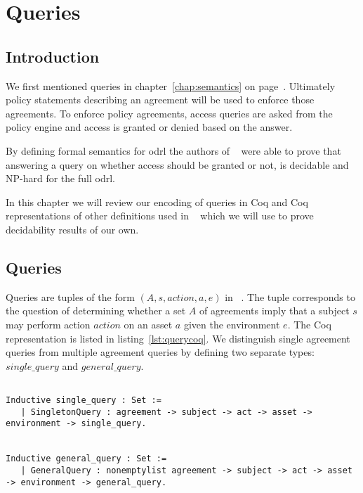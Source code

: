 \chapter{Queries}\label{chap:queries}


\section{Introduction}


We first mentioned queries in chapter~\ref{chap:semantics} on page~\pageref{chap:semantics}. Ultimately policy statements describing an agreement will be used to enforce those agreements. To enforce policy agreements, access queries are asked from the policy engine and access is granted or denied based on the answer.

By defining formal semantics for \ac{odrl} the authors of ~\cite{pucella2006} were able to prove that answering a query on whether access should be granted or not, is decidable and NP-hard for the full \ac{odrl}. 

In this chapter we will review our encoding of queries in Coq and Coq representations of other definitions used in ~\cite{pucella2006} which we will use to prove decidability results of our own. 


\section{Queries}

Queries are tuples of the form $(A, s, action, a, e)$ in ~\cite{pucella2006}. The tuple corresponds to the question of determining whether a set $A$ of agreements imply that a subject $s$ may perform action $action$ on an asset $a$ given the environment $e$. The Coq representation is listed in listing~\ref{lst:querycoq}. We distinguish single agreement queries from multiple agreement queries by defining two separate types: $single\_query$ and $general\_query$.

\begin{lstlisting}

Inductive single_query : Set := 
   | SingletonQuery : agreement -> subject -> act -> asset -> environment -> single_query.
   

Inductive general_query : Set := 
   | GeneralQuery : nonemptylist agreement -> subject -> act -> asset -> environment -> general_query.
\end{lstlisting}

